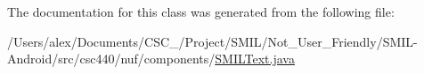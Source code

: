 The documentation for this class was generated from the following file\-:\begin{DoxyCompactItemize}
\item 
/\-Users/alex/\-Documents/\-C\-S\-C\-\_/\-Project/\-S\-M\-I\-L/\-Not\-\_\-\-User\-\_\-\-Friendly/\-S\-M\-I\-L-\/\-Android/src/csc440/nuf/components/\hyperlink{_s_m_i_l_text_8java}{S\-M\-I\-L\-Text.\-java}\end{DoxyCompactItemize}
